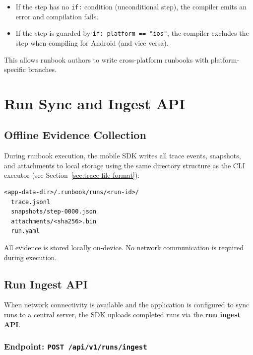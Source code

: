 \begin{itemize}
  \item If the step has no \texttt{if:} condition (unconditional step), the compiler emits an error and compilation fails.
  \item If the step is guarded by \texttt{if: platform == "ios"}, the compiler excludes the step when compiling for Android (and vice versa).
\end{itemize}

This allows runbook authors to write cross-platform runbooks with platform-specific branches.

\section{Run Sync and Ingest API}

\subsection{Offline Evidence Collection}

During runbook execution, the mobile SDK writes all trace events, snapshots, and attachments to local storage using the same directory structure as the CLI executor (see Section~\ref{sec:trace-file-format}):

\begin{verbatim}
<app-data-dir>/.runbook/runs/<run-id>/
  trace.jsonl
  snapshots/step-0000.json
  attachments/<sha256>.bin
  run.yaml
\end{verbatim}

All evidence is stored locally on-device. No network communication is required during execution.

\subsection{Run Ingest API}

When network connectivity is available and the application is configured to sync runs to a central server, the SDK uploads completed runs via the \textbf{run ingest API}.

\subsubsection{Endpoint: \texttt{POST /api/v1/runs/ingest}}

